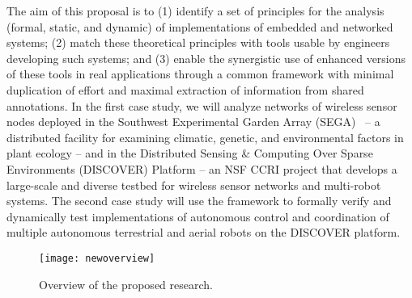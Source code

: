 
The aim of this proposal is to (1) identify a set of principles for
the analysis (formal, static, and dynamic) of implementations of
embedded and networked systems; (2) match these theoretical principles
with tools usable by engineers developing such systems; and (3) enable
the synergistic use of enhanced versions of these tools in real
applications through a common framework with minimal duplication of
effort and maximal extraction of information from shared annotations.
In the first case study, we will analyze networks of wireless sensor
nodes deployed in the Southwest Experimental Garden Array
(SEGA)~\cite{YamEtAl10,FliEtAl12} -- a distributed facility for
examining climatic, genetic, and environmental factors in plant
ecology -- and in the Distributed Sensing \& Computing Over Sparse
Environments (DISCOVER) Platform -- an NSF CCRI project that develops
a large-scale and diverse testbed for wireless sensor networks and
multi-robot systems.  The second case study will use the framework to
formally verify and dynamically test implementations of autonomous
control and coordination of multiple autonomous terrestrial and aerial
robots on the DISCOVER platform.

\begin{figure}[!t]
  \centering
  \texttt{[image: newoverview]}
  \caption{Overview of the proposed research.}
  \label{fig:overview}
\end{figure}

